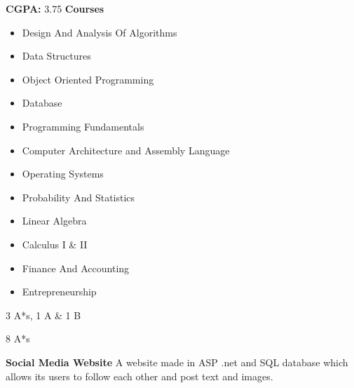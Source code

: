 \documentclass[10pt,a4paper]{altacv}
\begin{document}
\tagline{}

%

\begin{fullwidth}
\makecvheader
\end{fullwidth}

\medskip
\medskip
%


\textbf{CGPA:} 3.75 \newline
\textbf{Courses} 
\begin{itemize}
    \item Design And Analysis Of Algorithms
    \item Data Structures
    \item Object Oriented Programming 
    \item Database
    \item Programming Fundamentals
    \item Computer Architecture and Assembly Language
    \item Operating Systems
    \item Probability And Statistics
    \item Linear Algebra
    \item Calculus I \& II
    \item Finance And Accounting
    \item Entrepreneurship
\end{itemize}
\divider\smallskip

\textbullet{} \small{3 A*s, 1 A \& 1 B}

\divider\smallskip

\textbullet{} \small{8 A*s}
\medskip


\textbf{\large{Social Media Website}}
\newline
A website made in ASP .net and SQL database which allows its users to follow each other and post text and images.
\newline
\end{document}
